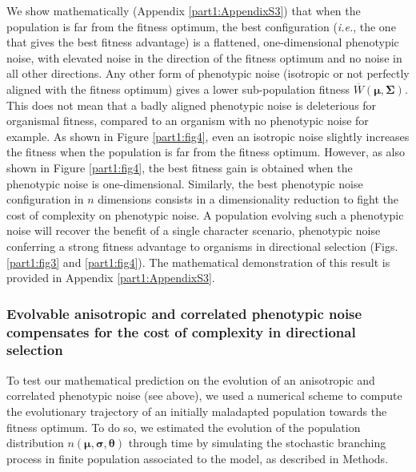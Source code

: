 We show mathematically (Appendix \ref{part1:AppendixS3}) that when the population is far from the fitness optimum, the best configuration (\textit{i.e.}, the one that gives the best fitness advantage) is a flattened, one-dimensional phenotypic noise, with elevated noise in the direction of the fitness optimum and no noise in all other directions. Any other form of phenotypic noise (isotropic or not perfectly aligned with the fitness optimum) gives a lower sub-population fitness $\overline{W}(\boldsymbol{\mu},\boldsymbol{\Sigma})$. This does not mean that a badly aligned phenotypic noise is deleterious for organismal fitness, compared to an organism with no phenotypic noise for example. As shown in Figure \ref{part1:fig4}, even an isotropic noise slightly increases the fitness when the population is far from the fitness optimum. However, as also shown in Figure \ref{part1:fig4}, the best fitness gain is obtained when the phenotypic noise is one-dimensional. Similarly, the best phenotypic noise configuration in $n$ dimensions consists in a dimensionality reduction to fight the cost of complexity on phenotypic noise. A population evolving such a phenotypic noise will recover the benefit of a single character scenario, phenotypic noise conferring a strong fitness advantage to organisms in directional selection (Figs. \ref{part1:fig3} and \ref{part1:fig4}).
The mathematical demonstration of this result is provided in Appendix \ref{part1:AppendixS3}.


\subsubsection{Evolvable anisotropic and correlated phenotypic noise compensates for the cost of complexity in directional selection}

To test our mathematical prediction on the evolution of an anisotropic and correlated phenotypic noise (see above), we used a numerical scheme to compute the evolutionary trajectory of an initially maladapted population towards the fitness optimum. To do so, we estimated the evolution of the population distribution $n(\boldsymbol{\mu},\boldsymbol{\sigma},\boldsymbol{\theta})$ through time by simulating the stochastic branching process in finite population associated to the model, as described in Methods.

